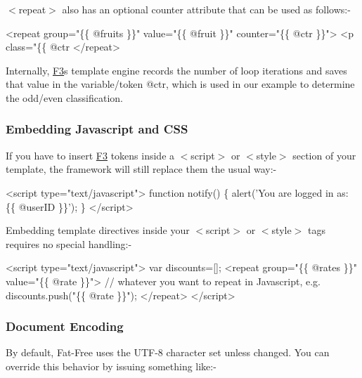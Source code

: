 {\ttfamily $<$repeat$>$} also has an optional counter attribute that can be used as follows\+:-\/


\begin{DoxyCode}
<repeat group="\{\{ @fruits \}\}" value="\{\{ @fruit \}\}" counter="\{\{ @ctr \}\}">
    <p class="\{\{ @ctr%
</repeat>
\end{DoxyCode}


Internally, \hyperlink{class_f3}{F3}\textquotesingle{}s template engine records the number of loop iterations and saves that value in the variable/token {\ttfamily @ctr}, which is used in our example to determine the odd/even classification.

\subsubsection*{Embedding Javascript and C\+SS}

If you have to insert \hyperlink{class_f3}{F3} tokens inside a {\ttfamily $<$script$>$} or {\ttfamily $<$style$>$} section of your template, the framework will still replace them the usual way\+:-\/


\begin{DoxyCode}
<script type="text/javascript">
    function notify() \{
        alert('You are logged in as: \{\{ @userID \}\}');
    \}
</script>
\end{DoxyCode}


Embedding template directives inside your {\ttfamily $<$script$>$} or {\ttfamily $<$style$>$} tags requires no special handling\+:-\/


\begin{DoxyCode}
<script type="text/javascript">
    var discounts=[];
    <repeat group="\{\{ @rates \}\}" value="\{\{ @rate \}\}">
        // whatever you want to repeat in Javascript, e.g.
        discounts.push("\{\{ @rate \}\}");
    </repeat>
</script>
\end{DoxyCode}


\subsubsection*{Document Encoding}

By default, Fat-\/\+Free uses the U\+T\+F-\/8 character set unless changed. You can override this behavior by issuing something like\+:-\/




